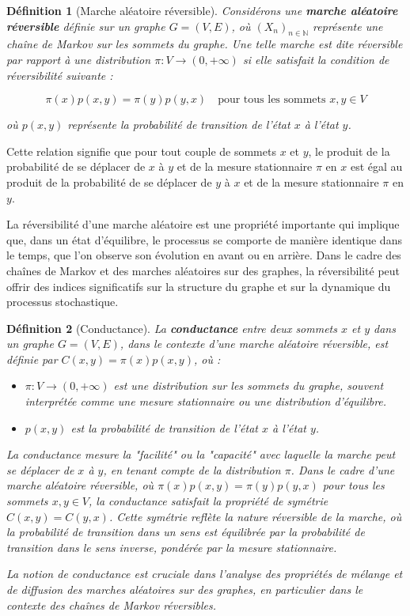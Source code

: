 \documentclass{article}
\theoremstyle{pasdepoint}
\newtheorem{definition}{Définition}
\theoremstyle{break}
\theoremstyle{pasdepoint}
\begin{document}
\begin{definition}[Marche aléatoire réversible]
    Considérons une \textbf{marche aléatoire réversible} définie sur un graphe $G = (V, E)$, où $(X_n)_{n \in \mathbb{N}}$ représente une chaîne de Markov sur les sommets du graphe. Une telle marche est dite réversible par rapport à une distribution $\pi : V \rightarrow (0, +\infty)$ si elle satisfait la condition de réversibilité suivante :

    \[
    \pi(x)p(x, y) = \pi(y)p(y, x) \quad \text{pour tous les sommets } x, y \in V
    \]

    où $p(x, y)$ représente la probabilité de transition de l'état $x$ à l'état $y$.

\end{definition}

Cette relation signifie que pour tout couple de sommets $x$ et $y$, le produit de la probabilité de se déplacer de $x$ à $y$ et de la mesure stationnaire $\pi$ en $x$ est égal au produit de la probabilité de se déplacer de $y$ à $x$ et de la mesure stationnaire $\pi$ en $y$.

La réversibilité d'une marche aléatoire est une propriété importante qui implique que, dans un état d'équilibre, le processus se comporte de manière identique dans le temps, que l'on observe son évolution en avant ou en arrière. Dans le cadre des chaînes de Markov et des marches aléatoires sur des graphes, la réversibilité peut offrir des indices significatifs sur la structure du graphe et sur la dynamique du processus stochastique.
\begin{definition}[Conductance]
    La \textbf{conductance} entre deux sommets \(x\) et \(y\) dans un graphe \(G = (V, E)\), dans le contexte d'une marche aléatoire réversible, est définie par \(C(x, y) = \pi(x)p(x, y)\), où :
    \begin{itemize}
        \item \(\pi : V \rightarrow (0, +\infty)\) est une distribution sur les sommets du graphe, souvent interprétée comme une mesure stationnaire ou une distribution d'équilibre.
        \item \(p(x, y)\) est la probabilité de transition de l'état \(x\) à l'état \(y\).
    \end{itemize}

    La conductance mesure la "facilité" ou la "capacité" avec laquelle la marche peut se déplacer de \(x\) à \(y\), en tenant compte de la distribution \(\pi\). Dans le cadre d'une marche aléatoire réversible, où \(\pi(x)p(x, y) = \pi(y)p(y, x)\) pour tous les sommets \(x, y \in V\), la conductance satisfait la propriété de symétrie \(C(x, y) = C(y, x)\). Cette symétrie reflète la nature réversible de la marche, où la probabilité de transition dans un sens est équilibrée par la probabilité de transition dans le sens inverse, pondérée par la mesure stationnaire.

    La notion de conductance est cruciale dans l'analyse des propriétés de mélange et de diffusion des marches aléatoires sur des graphes, en particulier dans le contexte des chaînes de Markov réversibles.
\end{definition}
\end{document}

